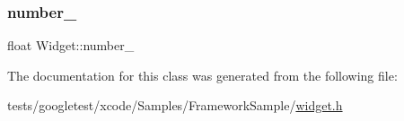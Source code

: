 \mbox{\label{classWidget_a27a2b3fd66372d5731fa9a6bcaab755b}} 
\subsubsection{\texorpdfstring{number\+\_\+}{number\_}}
{\footnotesize\ttfamily float Widget\+::number\+\_\+\hspace{0.3cm}{\ttfamily [private]}}



The documentation for this class was generated from the following file\+:\begin{DoxyCompactItemize}
\item 
tests/googletest/xcode/\+Samples/\+Framework\+Sample/\hyperlink{widget_8h}{widget.\+h}\end{DoxyCompactItemize}
